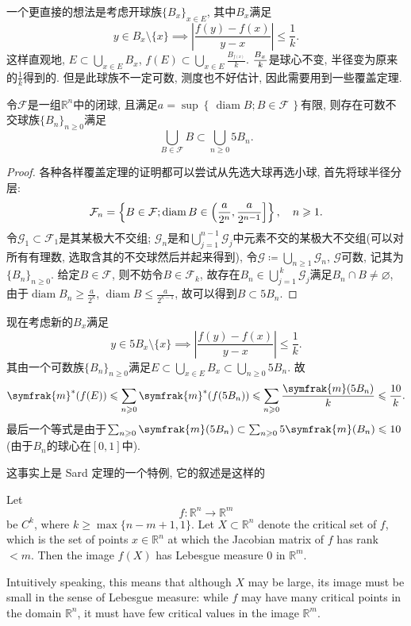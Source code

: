 \documentclass[options]{article}
\begin{document}
一个更直接的想法是考虑开球族$\{B_x\}_{x\in E}$, 其中$B_x$满足
\[y\in B_x\setminus\{x\}\implies \left| \frac{f(y)-f(x)}{y-x} \right|\leqslant \frac{1}{k}. \]
这样直观地, $E\subset\bigcup_{x\in E}B_x$, $f(E)\subset \bigcup_{x\in E} \frac{B_{^{f(x)}}}{k}$. $\frac {B_{^{x\vphantom{h}}}}{k}$是球心不变, 半径变为原来的$\frac{1}{k}$得到的. 但是此球族不一定可数, 测度也不好估计, 因此需要用到一些覆盖定理.\par
\medskip
	令$\mathcal F$是一组$\mathbb R^n$中的闭球, 且满足$a=\sup\left\{\,\operatorname*{diam}B; B\in \mathcal F\,\right\}$有限, 则存在可数不交球族$\{B_n\}_{n\geqslant 0}$满足
	\[\bigcup_{B\in\mathcal F}B\subset\bigcup_{n\geqslant 0}5B_n.\]
	\begin{proof}
		各种各样覆盖定理的证明都可以尝试从先选大球再选小球, 首先将球半径分层:
		\[
				\mathcal F_n=\left\{
				B\in\mathcal F; \operatorname{diam}B\in\Bigl( \frac{a}{2^n},\frac{a}{2^{n-1}}\Bigr]
				\right\},\quad n\geqslant 1.
		\]
		令$\mathcal G_1\subset \mathcal F_1$是其某极大不交组; $\mathcal G_n$是和$\bigcup_{j=1}^{n-1}\mathcal G_j$中元素不交的某极大不交组(可以对所有有理数, 选取含其的不交球然后并起来得到), 令$\mathcal G\coloneq \bigcup_{n\geqslant 1}\mathcal G_n$, $\mathcal G$可数, 记其为$\{B_n\}_{n\geqslant 0}$. 给定$B\in\mathcal F$, 则不妨令$B\in\mathcal F_k$, 故存在$B_n\in\bigcup_{j=1}^{\,k}\mathcal G_j$满足$B_n\cap B\neq\varnothing$, 由于$\operatorname*{diam}B_n\geqslant  \frac{a}{2^k}$, $\operatorname*{diam}B\leqslant \frac{a}{2^{k-1}}$, 故可以得到$B\subset 5B_n$.
	\end{proof}
	现在考虑新的$B_x$满足
	\[y\in 5B_x\setminus\{x\}\implies \left| \frac{f(y)-f(x)}{y-x} \right|\leqslant \frac{1}{k}.\]
	其由一个可数族$\{B_n\}_{n\geqslant 0}$满足$E\subset\bigcup_{x\in E}B_x\subset\bigcup_{n\geqslant 0}5B_n$. 故
	\[\symfrak{m}^*(f(E))\leqslant \sum_{n\geqslant 0} \symfrak{m}^* (f(5B_n))\leqslant \sum_{n\geqslant 0} \frac{\symfrak{m}(5B_n)}{k}\leqslant \frac{10}{k}.\]
	最后一个等式是由于$\sum_{n\geqslant 0}\symfrak{m}(5B_n)\subset \sum_{n\geqslant 0}5\symfrak{m}(B_n)\leqslant 10$ (由于$B_n$的球心在$[0,1]$中).


这事实上是 Sard 定理的一个特例, 它的叙述是这样的
\begin{remark}
	Let
	\[
			f\colon \mathbb{R}^n \rightarrow \mathbb{R}^m
	\]
	be $C^k$, where $k \geq \max \{n-m+1,1\}$. Let $X \subset \mathbb{R}^n$ denote the critical set of $f$, which is the set of points $x \in \mathbb{R}^n$ at which the Jacobian matrix of $f$ has rank $<m$. Then the image $f(X)$ has Lebesgue measure $0$ in $\mathbb{R}^m$.

	Intuitively speaking, this means that although $X$ may be large, its image must be small in the sense of Lebesgue measure: while $f$ may have many critical points in the domain $\mathbb{R}^n$, it must have few critical values in the image $\mathbb{R}^m$.
\end{remark}
	
\end{document}
